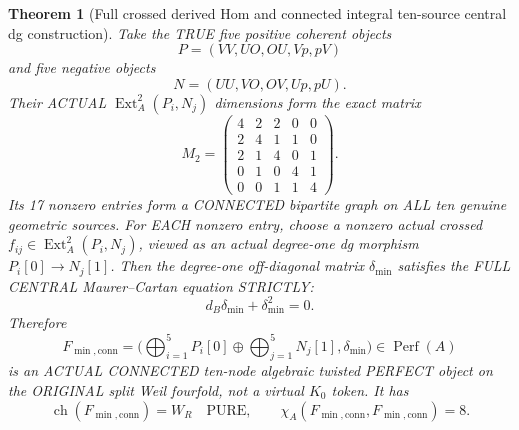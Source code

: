 \documentclass[11pt,a4paper]{article}
\newcommand{\ch}{\operatorname{ch}}
\newtheorem{theorem}{Theorem}[section]
\begin{document}
\begin{theorem}[Full crossed derived Hom and connected integral ten-source central dg construction]
Take the TRUE
five positive
coherent objects
\[
 P=(VV,UO,OU,Vp,pV)
\]
and five
negative objects
\[
 N=(UU,VO,OV,Up,pU).
\]
Their ACTUAL
\(\operatorname{Ext}^2_A(P_i,N_j)\)
dimensions form the
exact matrix
\[
 \boxed{
 M_2=
 \begin{pmatrix}
 4&2&2&0&0\\
 2&4&1&1&0\\
 2&1&4&0&1\\
 0&1&0&4&1\\
 0&0&1&1&4
 \end{pmatrix}.}                                      \tag{12.2}
\]
Its 17 nonzero
entries form a
CONNECTED
bipartite graph
on ALL ten
genuine geometric
sources.
For EACH nonzero
entry, choose
a nonzero actual
crossed
\(
f_{ij}\in
\operatorname{Ext}^2_A(P_i,N_j)
\),
viewed as an
actual degree-one
dg morphism
\(P_i[0]\to N_j[1]\).
Then the degree-one
off-diagonal
matrix
\(\delta_{\min}\)
satisfies the
FULL CENTRAL
Maurer--Cartan
equation STRICTLY:
\[
 \boxed{
 d_B\delta_{\min}
    +\delta_{\min}^2=0.}                        \tag{12.3}
\]
Therefore
\[
 \boxed{
 F_{\min,\mathrm{conn}}
 =\biggl(
   \bigoplus_{i=1}^5P_i[0]
       \oplus
   \bigoplus_{j=1}^5N_j[1],
       \delta_{\min}
       \biggr)\in\operatorname{Perf}(A)
 }                                                      \tag{12.4}
\]
is an ACTUAL
CONNECTED
ten-node
algebraic
twisted PERFECT
object on the
ORIGINAL split
Weil fourfold,
not a virtual
\(K_0\) token.
It has
\[
 \boxed{
 \ch(F_{\min,\mathrm{conn}})
   =W_R\quad\text{PURE},
 \qquad
 \chi_A(F_{\min,\mathrm{conn}},
          F_{\min,\mathrm{conn}})=8 .}             \tag{12.5}
\]
\end{theorem}
\end{document}
